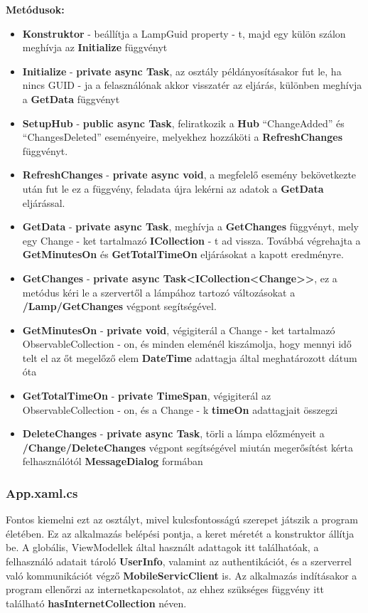\documentclass[a4paper,12pt]{report}
\begin{document}
    \textbf{Metódusok:}

\begin{itemize}
    \item \textbf{Konstruktor} - beállítja a LampGuid property - t, majd egy külön szálon meghívja az \textbf{Initialize} függvényt
    \item \textbf{Initialize} - \textbf{private async Task}, az osztály példányosításakor fut le, ha nincs GUID - ja a felasználónak akkor
    visszatér az eljárás, különben meghívja a \textbf{GetData} függvényt
    \item \textbf{SetupHub} - \textbf{public async Task}, feliratkozik a \textbf{Hub} ``ChangeAdded'' és ``ChangesDeleted'' eseményeire,
    melyekhez hozzáköti a \textbf{RefreshChanges} függvényt.
    \item \textbf{RefreshChanges} - \textbf{private async void}, a megfelelő esemény bekövetkezte után fut le ez a függvény, feladata
    újra lekérni az adatok a \textbf{GetData} eljárással.
    \item \textbf{GetData} - \textbf{private async Task}, meghívja a \textbf{GetChanges} függvényt, mely egy Change - ket tartalmazó
    \textbf{ICollection} - t ad vissza. Továbbá végrehajta a \textbf{GetMinutesOn} és \textbf{GetTotalTimeOn} eljárásokat a kapott eredményre.
    \item \textbf{GetChanges} - \textbf{private async Task<ICollection<Change>>}, ez a metódus kéri le a szervertől a lámpához tartozó változásokat a
    \textbf{/Lamp/GetChanges} végpont segítségével.
    \item \textbf{GetMinutesOn} - \textbf{private void}, végigiterál a Change - ket tartalmazó ObservableCollection - on, és minden eleménél
    kiszámolja, hogy mennyi idő telt el az őt megelőző elem \textbf{DateTime} adattagja által meghatározott dátum óta
    \item \textbf{GetTotalTimeOn} - \textbf{private TimeSpan}, végigiterál az ObservableCollection - on, és a Change - k \textbf{timeOn} adattagjait
    összegzi
    \item \textbf{DeleteChanges} - \textbf{private async Task}, törli a lámpa előzményeit a \textbf{/Change/DeleteChanges} végpont segítségével
    miután megerősítést kérta felhasználótól \textbf{MessageDialog} formában
\end{itemize}

\subsubsection{App.xaml.cs}
    Fontos kiemelni ezt az osztályt, mivel kulcsfontosságú szerepet játszik a program életében. Ez az alkalmazás belépési pontja,
    a keret méretét a konstruktor állítja be. A globális, ViewModellek által használt adattagok itt találhatóak, a felhasználó adatait
    tároló \textbf{UserInfo}, valamint az authentikációt, és a szerverrel való kommunikációt végző \textbf{MobileServicClient} is.
    Az alkalmazás indításakor a program ellenőrzi az internetkapcsolatot, az ehhez szükséges függvény itt található \textbf{hasInternetCollection}
    néven.
\end{document}

